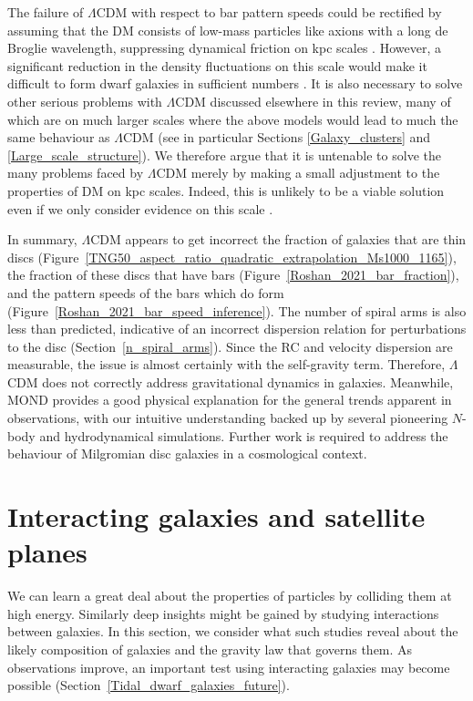 \documentclass[fleqn,usenatbib,useAMS,onecolumn]{mnras} %
\begin{document}
The failure of $\Lambda$CDM with respect to bar pattern speeds could be rectified by assuming that the DM consists of low-mass particles like axions with a long de Broglie wavelength, suppressing dynamical friction on kpc scales \citep[for a review, see][]{Lee_2018_review}. However, a significant reduction in the density fluctuations on this scale would make it difficult to form dwarf galaxies in sufficient numbers \citep[see section~6 of][]{Roshan_2021_bar_speed}. It is also necessary to solve other serious problems with $\Lambda$CDM discussed elsewhere in this review, many of which are on much larger scales where the above models would lead to much the same behaviour as $\Lambda$CDM (see in particular Sections \ref{Galaxy_clusters} and \ref{Large_scale_structure}). We therefore argue that it is untenable to solve the many problems faced by $\Lambda$CDM merely by making a small adjustment to the properties of DM on kpc scales. Indeed, this is unlikely to be a viable solution even if we only consider evidence on this scale \citep{Rogers_2021}.

In summary, $\Lambda$CDM appears to get incorrect the fraction of galaxies that are thin discs (Figure~\ref{TNG50_aspect_ratio_quadratic_extrapolation_Ms1000_1165}), the fraction of these discs that have bars (Figure~\ref{Roshan_2021_bar_fraction}), and the pattern speeds of the bars which do form (Figure~\ref{Roshan_2021_bar_speed_inference}). The number of spiral arms is also less than predicted, indicative of an incorrect dispersion relation for perturbations to the disc (Section~\ref{n_spiral_arms}). Since the RC and velocity dispersion are measurable, the issue is almost certainly with the self-gravity term. Therefore, $\Lambda$CDM does not correctly address gravitational dynamics in galaxies. Meanwhile, MOND provides a good physical explanation for the general trends apparent in observations, with our intuitive understanding backed up by several pioneering $N$-body and hydrodynamical simulations. Further work is required to address the behaviour of Milgromian disc galaxies in a cosmological context.





\section{Interacting galaxies and satellite planes}
\label{Interacting_galaxies}

We can learn a great deal about the properties of particles by colliding them at high energy. Similarly deep insights might be gained by studying interactions between galaxies. In this section, we consider what such studies reveal about the likely composition of galaxies and the gravity law that governs them. As observations improve, an important test using interacting galaxies may become possible (Section~\ref{Tidal_dwarf_galaxies_future}).
\end{document}
